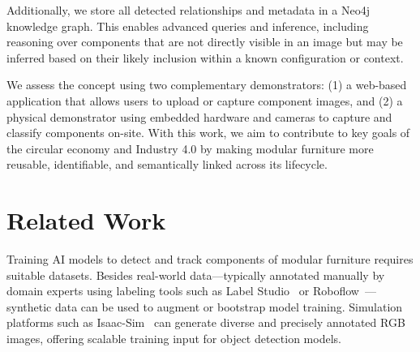 \documentclass[3p,times,procedia]{elsarticle}
\begin{document}
Additionally, we store all detected relationships and metadata in a Neo4j knowledge graph. This enables advanced queries and inference, including reasoning over components that are not directly visible in an image but may be inferred based on their likely inclusion within a known configuration or context.

We assess the concept using two complementary demonstrators: (1) a web-based application that allows users to upload or capture component images, and (2) a physical demonstrator using embedded hardware and cameras to capture and classify components on-site. With this work, we aim to contribute to key goals of the circular economy and Industry 4.0 by making modular furniture more reusable, identifiable, and semantically linked across its lifecycle.





\section{Related Work}

Training AI models to detect and track components of modular furniture requires suitable datasets. Besides real-world data—typically annotated manually by domain experts using labeling tools such as Label Studio~\cite{Labelstudio} or Roboflow~\cite{dwyer2024roboflow}—synthetic data can be used to augment or bootstrap model training. Simulation platforms such as Isaac-Sim~\cite{Isaac-Sim} can generate diverse and precisely annotated RGB images, offering scalable training input for object detection models.
\end{document}
